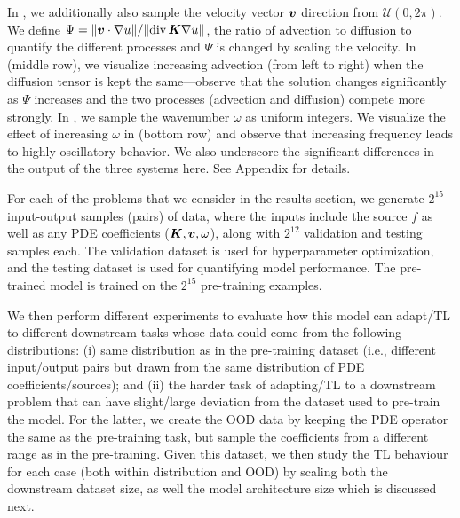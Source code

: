 \begin{enumerate}[leftmargin=5ex,nosep]
   In \sysB{}, we additionally also sample the velocity vector $\boldsymbol{v}$ direction from $\mathcal{U}(0, 2\pi)$. 
    We define $\Psi = \|\boldsymbol{v} \cdot \nabla u \|/\| \mbox{div}\, \boldsymbol{K} \nabla u \|$, the ratio of advection to diffusion to quantify the different processes and $\Psi$ is changed by scaling the velocity. In  (middle row), we visualize increasing advection (from left to right) when the diffusion tensor is kept the same---observe that the solution changes significantly as $\Psi$ increases and the two processes (advection and diffusion) compete more strongly.
   In \sysC{}, we sample the wavenumber $\omega$ as uniform integers.
   We visualize the effect of increasing $\omega$ in  (bottom row) and observe that increasing frequency leads to highly oscillatory behavior. We also underscore the significant differences in the output of the three systems here. See Appendix  for details.
\end{enumerate} 
%
For each of the problems that we consider in the results section, we generate $2^{15}$ input-output samples (pairs) of data, where the inputs include the source $f$ as well as any PDE
coefficients
($\boldsymbol{K}, \boldsymbol{v}, \omega$), along with $2^{12}$ validation and testing samples each. 
The validation dataset is used for hyperparameter optimization, and the testing dataset is used for quantifying model performance.
%
The pre-trained model is trained on the $2^{15}$ pre-training examples. 

We then perform different experiments to evaluate how this model can adapt/TL to different downstream tasks whose data could come from the following distributions: 
(i) same distribution as in the pre-training dataset (i.e., different input/output pairs but drawn from the same distribution of PDE coefficients/sources); and 
(ii) the harder
task of adapting/TL to a downstream problem that can have slight/large deviation from the dataset used to pre-train the model. 
For the latter, we create the OOD data by keeping the PDE operator the same as the pre-training task, but sample the coefficients from a different range as in the pre-training. 
Given this dataset, we then study the TL behaviour for each case (both within distribution and OOD) by scaling both the downstream dataset size, as well the model architecture size which is discussed next. 

